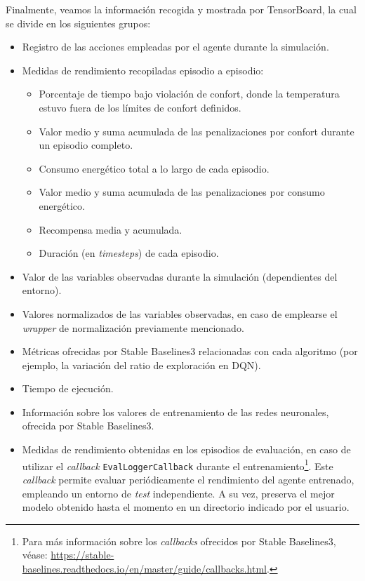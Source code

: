 Finalmente, veamos la información recogida y mostrada por TensorBoard, la cual se divide en los siguientes grupos:

\begin{itemize}
    \item Registro de las acciones empleadas por el agente durante la simulación.
    \item Medidas de rendimiento recopiladas episodio a episodio:
    \begin{itemize}
        \item Porcentaje de tiempo bajo violación de confort, donde la temperatura estuvo fuera de los límites de confort definidos.
        \item Valor medio y suma acumulada de las penalizaciones por confort durante un episodio completo.
        \item Consumo energético total a lo largo de cada episodio.
        \item Valor medio y suma acumulada de las penalizaciones por consumo energético.
        \item Recompensa media y acumulada.
        \item Duración (en \textit{timesteps}) de cada episodio.
    \end{itemize}
    \item Valor de las variables observadas durante la simulación (dependientes del entorno).
    \item Valores normalizados de las variables observadas, en caso de emplearse el \textit{wrapper} de normalización previamente mencionado.
    \item Métricas ofrecidas por Stable Baselines3 relacionadas con cada algoritmo (por ejemplo, la variación del ratio de exploración en DQN).
    \item Tiempo de ejecución.
    \item Información sobre los valores de entrenamiento de las redes neuronales, ofrecida por Stable Baselines3.
    \item Medidas de rendimiento obtenidas en los episodios de evaluación, en caso de utilizar el \textit{callback} \texttt{EvalLoggerCallback} durante el entrenamiento\footnote{Para más información sobre los \textit{callbacks} ofrecidos por Stable Baselines3, véase: \url{https://stable-baselines.readthedocs.io/en/master/guide/callbacks.html}.}. Este \textit{callback} permite evaluar periódicamente el rendimiento del agente entrenado, empleando un entorno de \textit{test} independiente. A su vez, preserva el mejor modelo obtenido hasta el momento en un directorio indicado por el usuario.
\end{itemize}
    

